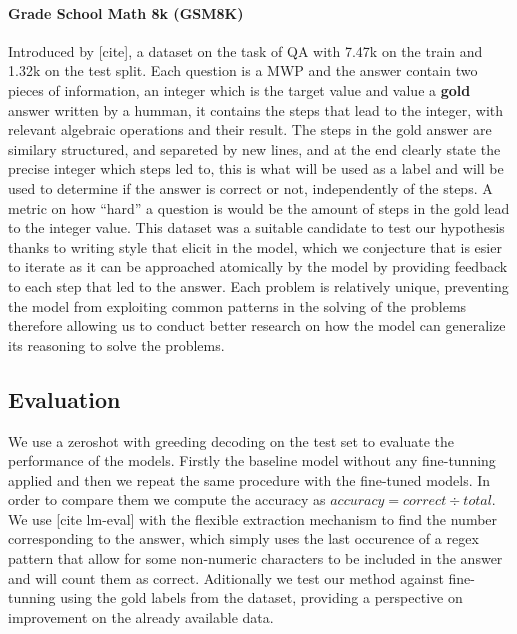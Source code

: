 \documentclass[a4paper,10pt]{article}
\begin{document}
\paragraph{Grade School Math 8k (GSM8K)}
Introduced by [cite], a dataset on the task of QA with 7.47k on the train and 1.32k on the test split. Each question is a MWP and the answer contain two pieces of information, an integer which is the target value and value a \textbf{gold} answer written by a humman, it contains the steps that lead to the integer, with relevant algebraic operations and their result. The steps in the gold answer are similary structured, and separeted by new lines, and at the end clearly state the precise integer which steps led to, this is what will be used as a label and will be used to determine if the answer is correct or not, independently of the steps. A metric on how ``hard'' a question is would be the amount of steps in the gold lead to the integer value. This dataset was a suitable candidate to test our hypothesis thanks to writing style that elicit in the model, which we conjecture that is esier to iterate as it can be approached atomically by the model by providing feedback to each step that led to the answer. Each problem is relatively unique, preventing the model from exploiting common patterns in the solving of the problems therefore allowing us to conduct better research on how the model can generalize its reasoning to solve the problems.



\subsection{Evaluation}
We use a zeroshot with greeding decoding on the test set to evaluate the performance of the models. Firstly the baseline model without any fine-tunning applied and then we repeat the same procedure with the fine-tuned models. In order to compare them we compute the accuracy as  $accuracy = correct \div total$. We use [cite lm-eval] with the flexible extraction mechanism to find the number corresponding to the answer, which simply uses the last occurence of a regex pattern that allow for some non-numeric characters to be included in the answer and will count them as correct. Aditionally we test our method against fine-tunning using the gold labels from the dataset, providing a perspective on improvement on the already available data.
\end{document}
